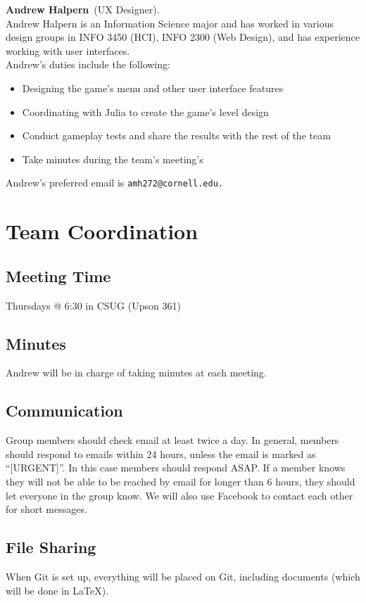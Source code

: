 \documentclass[letterpaper,11pt]{texMemo}
\newcommand{\teammember}[2]{ \textbf{#1}\ (#2).\ }
\newenvironment{duties}[1]
               {
                 #1's duties include the following:
                 \begin{itemize}
               }
               {
                 \end{itemize}
               }
\newcommand{\preferredemail}[2]{#1's preferred email is \texttt{#2}\\}
\begin{document}
\teammember{Andrew Halpern}{UX Designer}\\
Andrew Halpern is an Information Science major and has worked in various 
design groups in INFO 3450 (HCI), INFO 2300 (Web Design), and has experience 
working with user interfaces.\\
\begin{duties}{Andrew}
\item{Designing the game’s menu and other user interface features}
\item{Coordinating with Julia to create the game’s level design}
\item{Conduct gameplay tests and share the results with the rest of the team}
\item{Take minutes during the team’s meeting’s}
\end{duties}
\preferredemail{Andrew}{amh272@cornell.edu. }

\section*{Team Coordination}
\subsection*{Meeting Time}
Thursdays @ 6:30 in CSUG (Upson 361)

\subsection*{Minutes}
Andrew will be in charge of taking minutes at each meeting.

\subsection*{Communication}
Group members should check email at least twice a day. In general, members 
should respond to emails within 24 hours, unless the email is marked as 
``[URGENT]''. In this case members should respond ASAP. 
If a member knows they will not be able to be reached by email for longer than 
6 hours, they should let everyone in the group know. We will also use Facebook 
to contact each other for short messages.

\subsection*{File Sharing}
When Git is set up, everything will be placed on Git, including documents 
(which will be done in \LaTeX).
\end{document}

